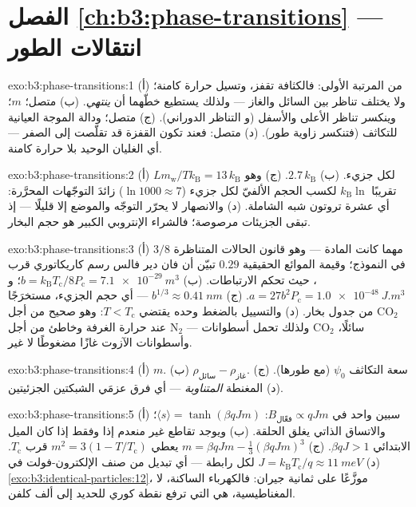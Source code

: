 \section*{الفصل \ref{ch:b3:phase-transitions} --- انتقالات الطور}

\begin{solution}{exo:b3:phase-transitions:1}
(أ) من المرتبة الأولى: فالكثافة تقفز، وتسيل حرارة كامنة؛ ولا يختلف
تناظر بين السائل والغاز --- ولذلك يستطيع خطّهما أن
\emph{ينتهي}. (ب) متصل؛  $m$؛ وينكسر تناظر الأعلى والأسفل (و
التناظر الدوراني). (ج) متصل؛ ودالة الموجة العيانية للتكاثف (فتنكسر
زاوية طور). (د) متصل:
فعند  تكون القفزة قد تقلّصت إلى الصفر --- أي
الغليان الوحيد بلا حرارة كامنة.
\end{solution}

\begin{solution}{exo:b3:phase-transitions:2}
(أ) $Lm_{\text{w}}/Tk_{\text{B}} = 13\,k_{\text{B}}$ لكل جزيء.
(ب) $2.7\,k_{\text{B}}$. (ج) وهو تقريبًا $k_{\text{B}}\ln$ لكسب
الحجم الألفيّ لكل جزيء ($\ln1000 \approx 7$) زائدَ
التوجّهات المحرَّرة: أي عشرة تروتون شبه الشاملة. (د)
والانصهار لا يحرّر التوجّه والموضع إلا قليلًا --- إذ تبقى
الجزيئات مرصوصة؛ فالشراء الإنتروبي الكبير هو حجم البخار.
\end{solution}

\begin{solution}{exo:b3:phase-transitions:3}
(أ) $3/8$ مهما كانت المادة --- وهو قانون الحالات
المتناظرة في النموذج؛ وقيمة الموائع الحقيقية $0.29$ تبيّن أن فان دير فالس رسم كاريكاتوري
قرب ، حيث تحكم الارتباطات. (ب) $b =
k_{\text{B}}T_{\text{c}}/8P_{\text{c}} = \qty{7.1e-29}{m^3}$؛ و $a =
27b^2P_{\text{c}} = \qty{1.0e-48}{J.m^3}$. (ج) $b^{1/3} \approx
\qty{0.41}{nm}$ --- أي حجم الجزيء، مستخرَجًا من جدول
بخار. (د) والتسييل بالضغط وحده يقتضي $T <
T_{\text{c}}$: وهو صحيح من أجل CO$_2$ عند حرارة الغرفة وخاطئ من أجل
N$_2$ --- ولذلك تحمل أسطوانات CO$_2$ سائلًا، وأسطوانات الآزوت
غازًا مضغوطًا لا غير.
\end{solution}

\begin{solution}{exo:b3:phase-transitions:4}
(أ) $m$. (ب) $\rho_{\text{سائل}} - \rho_{\text{غاز}}$. (ج)
سعة التكاثف $\psi_0$ (مع طورها). (د) المغنطة
\emph{المتناوبة} --- أي فرق عزمَي الشبكتين
الجزئيتين.
\end{solution}

\begin{solution}{exo:b3:phase-transitions:5}
(أ) سبين واحد في $B_{\text{فعّال}} \propto qJm$: $\langle s\rangle =
\tanh(\beta qJm)$؛ والاتساق الذاتي يغلق الحلقة. (ب) ويوجد تقاطع
غير منعدم إذا وفقط إذا كان الميل الابتدائي $\beta qJ > 1$. (ج) $m =
\beta qJm - \tfrac13(\beta qJm)^3$ يعطي $m^2 = 3(1 -
T/T_{\text{c}})$ قرب $T_{\text{c}}$. (د) $J =
k_{\text{B}}T_{\text{c}}/q \approx \qty{11}{meV}$ لكل رابطة ---
أي تبديل من صنف الإلكترون-فولت في
\cref{exo:b3:identical-particles:12}، موزَّعًا على ثمانية
جيران: فالكهرباء الساكنة، لا المغناطيسية، هي التي ترفع نقطة كوري للحديد
إلى ألف كلفن.
\end{solution}

